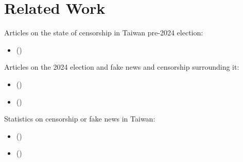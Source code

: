 \section{Related Work}\label{sec:related}

Articles on the state of censorship in Taiwan pre-2024 election:
\begin{itemize}
    \item (\cite{perspectives-taiwan})
\end{itemize}

Articles on the 2024 election and fake news and censorship surrounding it:
\begin{itemize}
    \item (\cite{npr-taiwan-misinfo})
    \item (\cite{ap-taiwan-misinfo})
\end{itemize}

Statistics on censorship or fake news in Taiwan:
\begin{itemize}
    \item (\cite{freedom-house-taiwan-22})
    \item (\cite{freedom-house-taiwan-23})
\end{itemize}